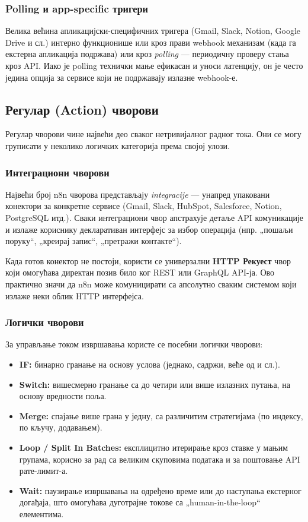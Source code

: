 \subsubsection{Polling и app-specific тригери}

Велика већина апликацијски-специфичних тригера (Gmail, Slack, Notion,
Google Drive и сл.) интерно функционише или кроз прави webhook
механизам (када га екстерна апликација подржава) или кроз
\textit{polling} — периодичну проверу стања кроз API. Иако је
polling технички мање ефикасан и уноси латенцију, он је често
једина опција за сервисе који не подржавају излазне webhook-е.

\subsection{Регулар (Action) чворови}

Регулар чворови чине највећи део сваког нетривијалног радног тока.
Они се могу груписати у неколико логичких категорија према својој
улози.

\subsubsection{Интеграциони чворови}

Највећи број n8n чворова представљају \textit{integracije} —
унапред упаковани конектори за конкретне сервисе (Gmail, Slack,
HubSpot, Salesforce, Notion, PostgreSQL итд.). Сваки интеграциони
чвор апстрахује детаље API комуникације и излаже кориснику
декларативан интерфејс за избор операција (нпр. „пошаљи поруку“,
„креирај запис“, „претражи контакте“).

Када готов конектор не постоји, користи се универзални
\textbf{HTTP Рекуест} чвор који омогућава директан позив било
ког REST или GraphQL API-ја. Ово практично значи да n8n може
комуницирати са апсолутно сваким системом који излаже неки облик
HTTP интерфејса.

\subsubsection{Логички чворови}

За управљање током извршавања користе се посебни логички
чворови:

\begin{itemize}
    \item \textbf{IF:} бинарно гранање на основу услова
    (једнако, садржи, веће од и сл.).
    \item \textbf{Switch:} вишесмерно гранање са до четири или више
    излазних путања, на основу вредности поља.
    \item \textbf{Merge:} спајање више грана у једну, са различитим
    стратегијама (по индексу, по кључу, додавањем).
    \item \textbf{Loop / Split In Batches:} експлицитно итерирање
    кроз ставке у мањим групама, корисно за рад са великим скуповима
    података и за поштовање API рате-лимит-а.
    \item \textbf{Wait:} паузирање извршавања на одређено време или
    до наступања екстерног догађаја, што омогућава дуготрајне токове
    са „human-in-the-loop“ елементима.
\end{itemize}

